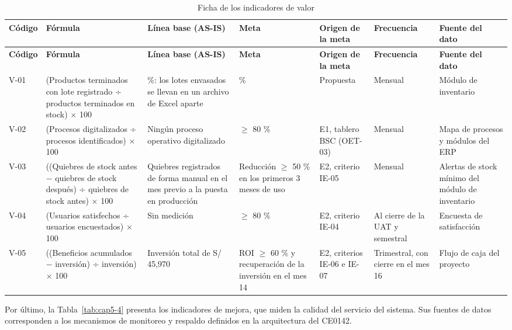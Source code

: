 {\small
\renewcommand{\arraystretch}{1.3}
\begin{longtable}{|>{\raggedright\arraybackslash}p{0.29cm}|>{\raggedright\arraybackslash}p{2.94cm}|>{\raggedright\arraybackslash}p{2.94cm}|>{\raggedright\arraybackslash}p{2.64cm}|>{\raggedright\arraybackslash}p{1.32cm}|>{\raggedright\arraybackslash}p{1.71cm}|>{\raggedright\arraybackslash}p{2.35cm}|}
\caption{Ficha de los indicadores de valor}\label{tab:cap5-3}\\
\hline
\textbf{Código} & \textbf{Fórmula} & \textbf{Línea base (AS-IS)} & \textbf{Meta} & \textbf{Origen de la meta} & \textbf{Frecuencia} & \textbf{Fuente del dato} \\
\hline
\endfirsthead
\hline
\textbf{Código} & \textbf{Fórmula} & \textbf{Línea base (AS-IS)} & \textbf{Meta} & \textbf{Origen de la meta} & \textbf{Frecuencia} & \textbf{Fuente del dato} \\
\hline
\endhead
V-01 & (Productos terminados con lote registrado ÷ productos terminados en stock) $\times$ 100 & 0 \%: los lotes envasados se llevan en un archivo de Excel aparte & 100 \% & Propuesta & Mensual & Módulo de inventario \\
\hline
V-02 & (Procesos digitalizados ÷ procesos identificados) $\times$ 100 & Ningún proceso operativo digitalizado & $\geq$ 80 \% & E1, tablero BSC (OET-03) & Mensual & Mapa de procesos y módulos del ERP \\
\hline
V-03 & ((Quiebres de stock antes − quiebres de stock después) ÷ quiebres de stock antes) $\times$ 100 & Quiebres registrados de forma manual en el mes previo a la puesta en producción & Reducción $\geq$ 50 \% en los primeros 3 meses de uso & E2, criterio IE-05 & Mensual & Alertas de stock mínimo del módulo de inventario \\
\hline
V-04 & (Usuarios satisfechos ÷ usuarios encuestados) $\times$ 100 & Sin medición & $\geq$ 80 \% & E2, criterio IE-04 & Al cierre de la UAT y semestral & Encuesta de satisfacción \\
\hline
V-05 & ((Beneficios acumulados − inversión) ÷ inversión) $\times$ 100 & Inversión total de S/ 45,970 & ROI $\geq$ 60 \% y recuperación de la inversión en el mes 14 & E2, criterios IE-06 e IE-07 & Trimestral, con cierre en el mes 16 & Flujo de caja del proyecto \\
\hline
\end{longtable}
}


Por último, la Tabla~\ref{tab:cap5-4} presenta los indicadores de mejora, que miden la calidad del servicio del sistema. Sus fuentes de datos corresponden a los mecanismos de monitoreo y respaldo definidos en la arquitectura del CE0142.


